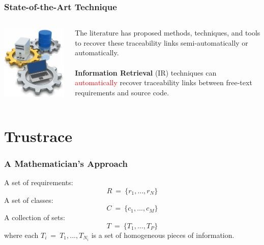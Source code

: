 \documentclass[12pt,hyperref=true,mathserif]{beamer}
\begin{document}
\begin{frame}
\frametitle{State-of-the-Art Technique}
\begin{columns}
\begin{column}{0.5\textwidth}
\includegraphics[scale=0.4]{Automation}
\end{column}
\begin{column}{0.5\textwidth}
The literature has proposed methods, techniques, and tools to recover these traceability links semi-automatically or automatically.\\
~\\
\textbf{Information Retrieval} (IR) techniques can \textcolor{red}{automatically} recover traceability links between free-text requirements and source code.
\end{column}
\end{columns}
\end{frame}

\section{Trustrace}
\begin{frame}
\frametitle{A Mathematician's Approach}
A set of requirements:
\begin{equation}\label{equ:Requirements}
  R~=~\{r_{1},...,r_{N}\}
\end{equation}
A set of classes:
\begin{equation}\label{equ:Classes}
  C~=~\{c_{1},...,c_{M}\}
\end{equation}
A collection of sets:
\begin{equation}\label{equ:Sets}
  T~=~\{T_{1},...,T_{P}\}
\end{equation}
where each $T_{i}~=~{T_{1},...,T_{N_{i}}}$ is a set of homogeneous pieces of information.
\end{frame}
\end{document}
